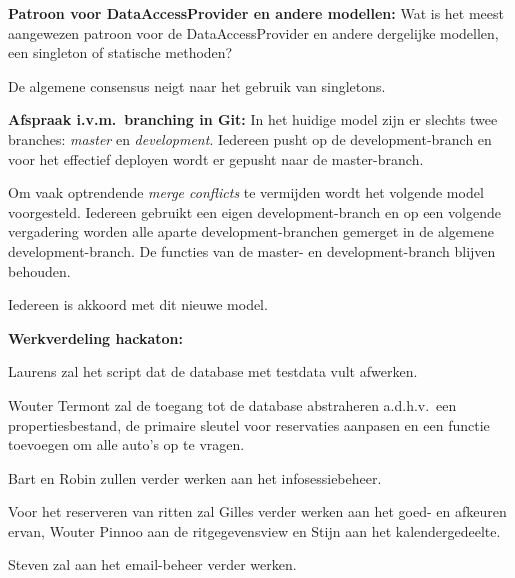 \documentclass[11pt,a4paper,oneside]{article}
\renewenvironment{itemize}[1]{\begin{compactitem}#1}{\end{compactitem}}
\begin{document}
\begin{itemize}
    \item \textbf{Patroon voor DataAccessProvider en andere modellen:}
        Wat is het meest aangewezen patroon voor de DataAccessProvider en
        andere dergelijke modellen, een singleton of statische methoden?

        De algemene consensus neigt naar het gebruik van singletons.

    \item \textbf{Afspraak i.v.m.\ branching in Git:}
        In het huidige model zijn er slechts twee branches: \emph{master} en
        \emph{development}. Iedereen pusht op de development-branch en voor het
        effectief deployen wordt er gepusht naar de master-branch.

        Om vaak optrendende \emph{merge conflicts} te vermijden wordt het
        volgende model voorgesteld. Iedereen gebruikt een eigen
        development-branch en op een volgende vergadering worden alle aparte
        development-branchen gemerget in de algemene development-branch. De
        functies van de master- en development-branch blijven behouden.

        Iedereen is akkoord met dit nieuwe model.

    \item \textbf{Werkverdeling hackaton:}
        \begin{itemize}
            \item Laurens zal het script dat de database met testdata vult afwerken.
            \item Wouter Termont zal de toegang tot de database abstraheren
                a.d.h.v.\ een propertiesbestand, de primaire sleutel voor
                reservaties aanpasen en een functie toevoegen om alle auto's op
                te vragen.
            \item Bart en Robin zullen verder werken aan het infosessiebeheer.
            \item Voor het reserveren van ritten zal Gilles verder werken aan
                het goed- en afkeuren ervan, Wouter Pinnoo aan de
                ritgegevensview en Stijn aan het kalendergedeelte.
            \item Steven zal aan het email-beheer verder werken.
        \end{itemize}

\end{itemize}
\end{document}
